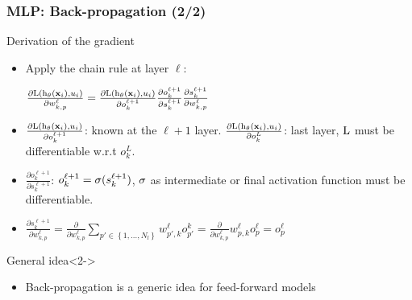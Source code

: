 \begin{frame}
  \frametitle{\acl{MLP}: Back-propagation (2/2)}
  \begin{block}{Derivation of the gradient}
  \begin{itemize}
    \item Apply the chain rule at layer $\ell$:

    $
    \frac{\partial \mathrm{L} \left ( {\mathrm{h}_{\mathbf{\theta}} \left ( {\mathbf{x}_i} \right ), u_i} \right ) }{\partial w_{k,p}^\ell} =
    \frac{\partial \mathrm{L} \left ( {\mathrm{h}_{\mathbf{\theta}} \left ( {\mathbf{x}_i} \right ), u_i} \right )}{\partial o_k^{\ell+1}} \frac{\partial o_k^{\ell+1}}{\partial s_k^{\ell+1}} \frac{\partial s_k^{\ell+1}}{\partial w_{k,p}^{\ell}}
    $

    \item $\frac{\partial \mathrm{L} \left ( {\mathrm{h}_{\mathbf{\theta}} \left ( {\mathbf{x}_i} \right ), u_i} \right )}{\partial o_k^{\ell+1}}$: known at the $\ell+1$ layer. $\frac{\partial \mathrm{L} \left ( {\mathrm{h}_{\mathbf{\theta}} \left ( {\mathbf{x}_i} \right ), u_i} \right )}{\partial o_k^{L}}$: last layer, $\mathrm{L}$ must be differentiable w.r.t $o_k^{L}$.


    \item $\frac{\partial o_k^{\ell+1}}{\partial s_k^{\ell+1}}$: $o_k^{\ell+1} = \mathrm{\sigma}(s_k^{\ell+1})$, $\mathrm{\sigma}$ as intermediate or final activation function must be differentiable.

    \item $\frac{\partial s_k^{\ell+1}}{\partial w_{k,p}^{\ell}} = \frac{\partial}{\partial w_{k,p}^{\ell}} \sum_{p' \in \left\{1,\ldots,N_l \right\}}  w_{p', k}^{\ell}o_{p'}^{k}= \frac{\partial }{\partial w_{k,p}^{\ell}}  w_{p, k}^{\ell}o_{p}^{\ell}=o_{p}^{\ell}$

    \end{itemize}
  \end{block}

  \begin{block}{General idea}<2->
    \begin{itemize}
    \item Back-propagation is a generic idea for feed-forward models
    \end{itemize}
  \end{block}
\end{frame}


